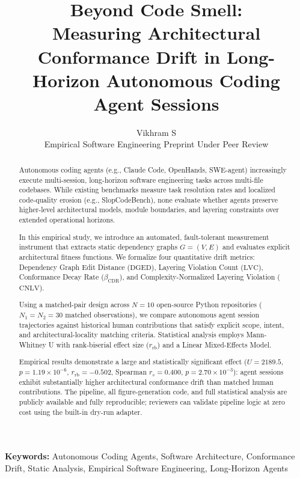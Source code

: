 \documentclass[11pt]{article}
\title{
    \textbf{Beyond Code Smell:}\\[0.25em]
    Measuring Architectural Conformance Drift in Long-Horizon
    Autonomous Coding Agent Sessions
}
\author{
    Vikhram S\\
    \small Empirical Software Engineering Preprint Under Peer Review
}
\date{}
\newcommand{\DGED}{\mathrm{DGED}}
\newcommand{\LVC}{\mathrm{LVC}}
\newcommand{\CNLV}{\mathrm{CNLV}}
\newcommand{\CDR}{\beta_{\mathrm{CDR}}}
\begin{document}
\maketitle


\begin{abstract}

Autonomous coding agents (e.g., Claude Code, OpenHands, SWE-agent)
increasingly execute multi-session, long-horizon software engineering
tasks across multi-file codebases. While existing benchmarks measure
task resolution rates and localized code-quality erosion
(e.g., SlopCodeBench), none evaluate whether agents preserve
higher-level architectural models, module boundaries, and layering
constraints over extended operational horizons.

In this empirical study, we introduce an automated, fault-tolerant
measurement instrument that extracts static dependency graphs
$G=(V,E)$ and evaluates explicit architectural fitness functions.
We formalize four quantitative drift metrics: Dependency Graph Edit
Distance ($\DGED$), Layering Violation Count ($\LVC$), Conformance Decay
Rate ($\CDR$), and Complexity-Normalized Layering Violation ($\CNLV$).

Using a matched-pair design across $N=10$ open-source Python repositories
($N_1=N_2=30$ matched observations), we compare autonomous agent
session trajectories against historical human contributions that satisfy
explicit scope, intent, and architectural-locality matching criteria.
Statistical analysis employs Mann-Whitney U with rank-biserial effect
size ($r_{\mathrm{rb}}$) and a Linear Mixed-Effects Model.

Empirical results demonstrate a large and statistically significant
effect ($U = 2189.5$, $p = 1.19 \times 10^{-6}$,
$r_{\mathrm{rb}} = -0.502$, Spearman $r_s = 0.400$,
$p = 2.70 \times 10^{-3}$): agent sessions exhibit substantially
higher architectural conformance drift than matched human contributions.
The pipeline, all figure-generation code, and full statistical analysis
are publicly available and fully reproducible; reviewers can validate
pipeline logic at zero cost using the built-in dry-run adapter.

\end{abstract}

\noindent
\textbf{Keywords:}
Autonomous Coding Agents,
Software Architecture,
Conformance Drift,
Static Analysis,
Empirical Software Engineering,
Long-Horizon Agents
\end{document}
